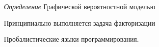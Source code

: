 \textit{Определение} Графической вероятностной моделью





Принципиально выполняется задача факторизации 


Пробалистические языки программирования.


